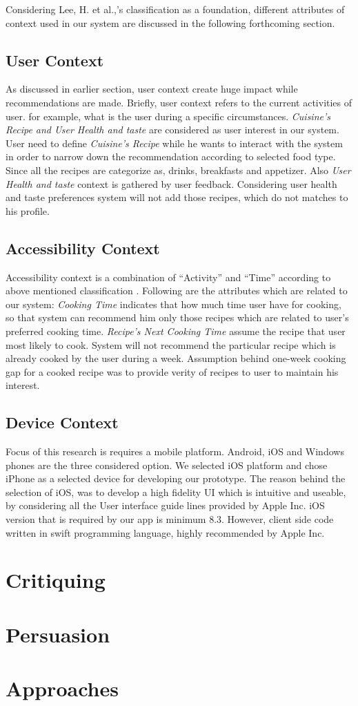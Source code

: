 Considering Lee, H. et al.,’s classification\cite{lee2005context} as a foundation, different attributes of  context used in our system are discussed in the following forthcoming section.

\subsection{User Context}

As discussed in earlier section, user context create huge impact while recommendations are made.  Briefly, user context refers to the current activities of user. for example, what is the user during a specific circumstances. \textit{Cuisine’s Recipe and User Health and taste} are considered as  user interest in our system. User need to define \textit{ Cuisine’s Recipe} while he wants to interact with the system in order to narrow down the recommendation  according to selected food type. Since all the recipes are categorize as, drinks, breakfasts and appetizer.  Also \textit{User Health and taste}  context is gathered by user feedback. Considering user health and taste preferences system will not add those recipes, which do not matches to his profile. 
	
\subsection{Accessibility Context}
	
Accessibility context is a combination of “Activity” and “Time” according to above mentioned classification \cite{lee2005context}.  Following are the attributes which are related to our system: \textit{Cooking Time} indicates that how much time user have for cooking, so that system can recommend him only those recipes which are related to user’s preferred cooking time. \textit{Recipe’s Next Cooking Time} assume the recipe that user most likely to cook. System will not recommend the particular recipe which is already cooked by the user during a week. Assumption behind one-week cooking gap for a cooked recipe was to provide verity of recipes to user to maintain his interest. 
	
\subsection{Device Context}
	
Focus of this research is requires a mobile platform. Android, iOS and Windows phones are the three considered option. We selected iOS platform and chose iPhone as a selected device for developing our prototype. The reason behind the selection of iOS, was to develop a high fidelity UI which is intuitive and useable, by considering all the User interface guide lines provided by Apple Inc. iOS version that is required by our app is minimum 8.3. However, client side code written in swift programming language, highly recommended by Apple Inc.

\section{Critiquing}

\section{Persuasion}

\section{Approaches}
